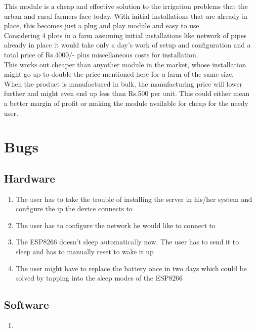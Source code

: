 \documentclass[16pt]{article}
\begin{document}
\hfill 
\vspace{1cm}

This module is a cheap and effective solution to the irrigation problems that the urban and rural farmers face today.
With initial installations that are already in place, this becomes just a plug and play module and easy to use.\\

Considering 4 plots in a farm assuming initial installations like network of pipes already in place it would take only a day's work of setup and configuration 
and a total price of Rs.4000/- plus miscellaneous costs for installation.\\

This works out cheaper than anyother module in the market, whose installation might go up to double the price mentioned here for a farm of the same size.
When the product is manufactured in bulk, the manufacturing price will lower further and might even end up less than Rs.500 per unit. This could
either mean a better margin of profit or making the module available for cheap for the needy user.  


\vspace{15cm}
\section{Bugs}

\vspace{0.5cm}

\subsection{Hardware}
\begin{enumerate}
 \item The user has to take the trouble of installing the server in his/her system and configure the ip the device connects to
 \item The user has to configure the network he would like to connect to 
 \item The ESP8266 doesn't sleep automatically now. The user has to send it to sleep and has to manually reset to wake it up
 \item The user might have to replace the battery once in two days which could be solved by tapping into the sleep modes of the ESP8266
\end{enumerate}

\vspace{0.5cm}

\subsection{Software}
\begin{enumerate}
 \item 
\end{enumerate}
\end{document}
